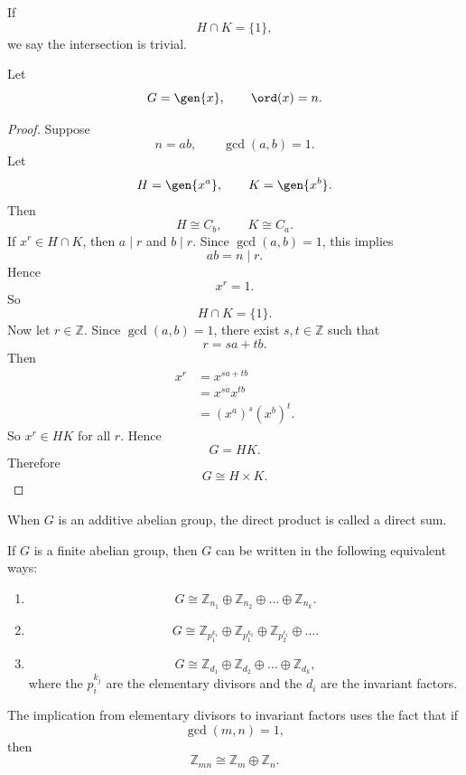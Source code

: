 \begin{definition}
If
\[
H\cap K=\{1\},
\]
we say the intersection is trivial.
\end{definition}

\begin{example}[Example 1]
Let
\[
G=\gen{x},
\qquad
\ord(x)=n.
\]
\end{example}

\begin{proof}
Suppose
\[
n=ab,
\qquad
\gcd(a,b)=1.
\]
Let
\[
H=\gen{x^a},
\qquad
K=\gen{x^b}.
\]
Then
\[
H\cong C_b,
\qquad
K\cong C_a.
\]
If $x^r\in H\cap K$, then $a\mid r$ and $b\mid r$.
Since $\gcd(a,b)=1$, this implies
\[
ab=n\mid r.
\]
Hence
\[
x^r=1.
\]
So
\[
H\cap K=\{1\}.
\]
Now let $r\in \mathbb{Z}$.
Since $\gcd(a,b)=1$, there exist $s,t\in \mathbb{Z}$ such that
\[
r=sa+tb.
\]
Then
\begin{align*}
x^r
&=
x^{sa+tb}\\
&=
x^{sa}x^{tb}\\
&=
(x^a)^s(x^b)^t.
\end{align*}
So $x^r\in HK$ for all $r$.
Hence
\[
G=HK.
\]
Therefore
\[
G\cong H\times K.
\]
\end{proof}

\begin{definition}
When $G$ is an additive abelian group, the direct product is called a direct sum.
\end{definition}

\begin{theorem*}{
If $G$ is a finite abelian group, then $G$ can be written in the following equivalent ways:
\begin{enumerate}
    \item
    \[
    G\cong \mathbb{Z}_{n_1}\oplus \mathbb{Z}_{n_2}\oplus\dots\oplus \mathbb{Z}_{n_k}.
    \]
    \item
    \[
    G\cong \mathbb{Z}_{p_1^{k_1}}\oplus \mathbb{Z}_{p_1^{k_2}}\oplus \mathbb{Z}_{p_2^{\ell_1}}\oplus\dots.
    \]
    \item
    \[
    G\cong \mathbb{Z}_{d_1}\oplus \mathbb{Z}_{d_2}\oplus\dots\oplus \mathbb{Z}_{d_k},
    \]
    where the $p_i^{k_j}$ are the elementary divisors and the $d_i$ are the invariant factors.
\end{enumerate}
}
\end{theorem*}

\begin{remark}
The implication from elementary divisors to invariant factors uses the fact that if
\[
\gcd(m,n)=1,
\]
then
\[
\mathbb{Z}_{mn}\cong \mathbb{Z}_m\oplus \mathbb{Z}_n.
\]
\end{remark}

